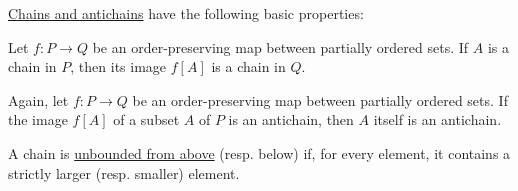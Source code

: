 \begin{proposition}\label{thm:def:partial_order_chain}
  \hyperref[thm:def:partial_order_chain]{Chains and antichains} have the following basic properties:
  \begin{thmenum}
     Let \( f: P \to Q \) be an order-preserving map between partially ordered sets. If \( A \) is a chain in \( P \), then its image \( f[A] \) is a chain in \( Q \).

     Again, let \( f: P \to Q \) be an order-preserving map between partially ordered sets. If the image \( f[A] \) of a subset \( A \) of \( P \) is an antichain, then \( A \) itself is an antichain.

     A chain is \hyperref[def:extremal_points/bounds]{unbounded from above} (resp. below) if, for every element, it contains a strictly larger (resp. smaller) element.

  \end{thmenum}
\end{proposition}
